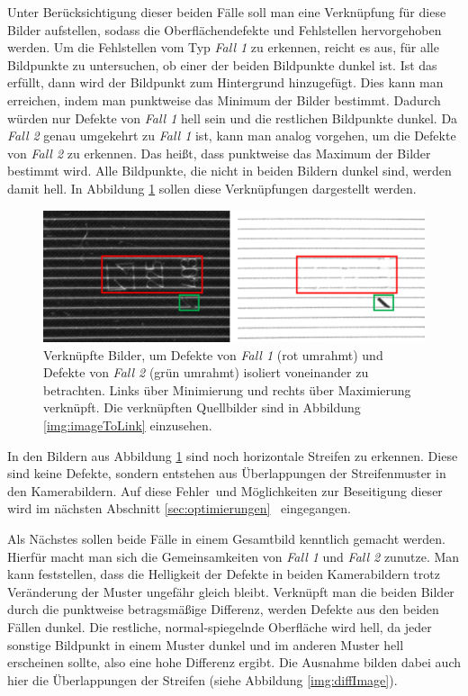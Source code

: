 \p
Unter Berücksichtigung dieser beiden Fälle soll man eine Verknüpfung für diese Bilder aufstellen, sodass die Oberflächendefekte und Fehlstellen hervorgehoben werden.
Um die Fehlstellen vom Typ \textit{Fall 1} zu erkennen, reicht es aus, für alle Bildpunkte zu untersuchen, ob einer der beiden Bildpunkte dunkel ist.
Ist das erfüllt, dann wird der Bildpunkt zum Hintergrund hinzugefügt.
Dies kann man erreichen, indem man punktweise das Minimum der Bilder bestimmt.
Dadurch würden nur Defekte von \textit{Fall 1} hell sein und die restlichen Bildpunkte dunkel.
Da \textit{Fall 2} genau umgekehrt zu \textit{Fall 1} ist, kann man analog vorgehen, um die Defekte von \textit{Fall 2} zu erkennen.
Das heißt, dass punktweise das Maximum der Bilder bestimmt wird.
Alle Bildpunkte, die nicht in beiden Bildern dunkel sind, werden damit hell.
In Abbildung \ref{img:minAndMaxLink} sollen diese Verknüpfungen dargestellt werden.

\begin{figure}[H]
	\centering
	\includegraphics[width=\textwidth]{03_sichtpruefungDurchLichtstreuung/einsatzVonMehrerenStreifenmustern/figures/minAndMaxLink}
	\caption[Verknüpfte Bilder über Minimierung und Maximierung]{Verknüpfte Bilder, um Defekte von \textit{Fall 1} (rot umrahmt) und Defekte von \textit{Fall 2} (grün umrahmt) isoliert voneinander zu betrachten. Links über Minimierung und rechts über Maximierung verknüpft. Die verknüpften Quellbilder sind in Abbildung \ref{img:imageToLink} einzusehen.}
	\label{img:minAndMaxLink}
\end{figure}

\noindent
In den Bildern aus Abbildung \ref{img:minAndMaxLink} sind noch horizontale Streifen zu erkennen.
Diese sind keine Defekte, sondern entstehen aus Überlappungen der Streifenmuster in den Kamerabildern.
Auf diese \glqq Fehler\grqq ~und Möglichkeiten zur Beseitigung dieser wird im nächsten Abschnitt \ref{sec:optimierungen} ~eingegangen.

\p
Als Nächstes sollen beide Fälle in einem Gesamtbild kenntlich gemacht werden.
Hierfür macht man sich die Gemeinsamkeiten von \textit{Fall 1} und \textit{Fall 2} zunutze.
Man kann feststellen, dass die Helligkeit der Defekte in beiden Kamerabildern trotz Veränderung der Muster ungefähr gleich bleibt.
Verknüpft man die beiden Bilder durch die punktweise betragsmäßige Differenz, werden Defekte aus den beiden Fällen dunkel.
Die restliche, normal-spiegelnde Oberfläche wird hell, da jeder sonstige Bildpunkt in einem Muster dunkel und im anderen Muster hell erscheinen sollte, also eine hohe Differenz ergibt.
Die Ausnahme bilden dabei auch hier die Überlappungen der Streifen (siehe Abbildung \ref{img:diffImage}).

